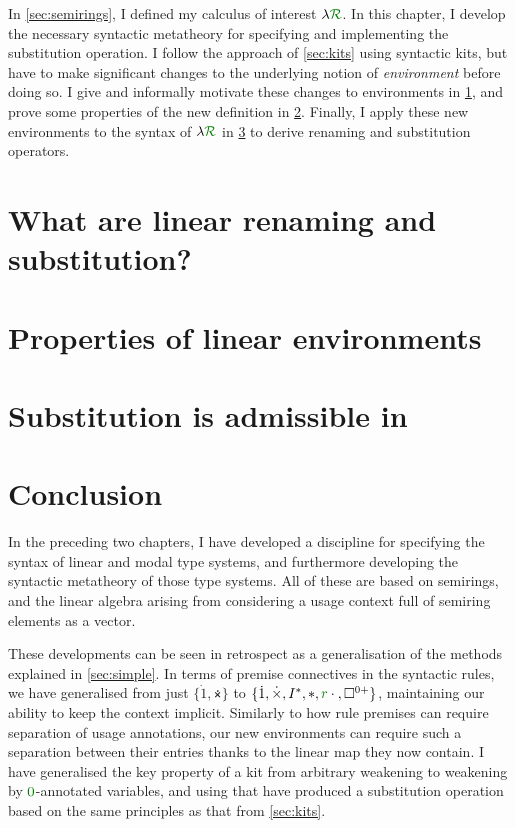 In \cref{sec:semirings}, I defined my calculus of interest $\name$.
In this chapter, I develop the necessary syntactic metatheory for
specifying and implementing the substitution operation.
I follow the approach of \cref{sec:kits} using syntactic kits, but have to make
significant changes to the underlying notion of \emph{environment} before doing
so.
I give and informally motivate these changes to environments in
\cref{sec:lrkits}, and prove some properties of the new definition in
\cref{sec:lenv}.
Finally, I apply these new environments to the syntax of $\name$ in
\cref{sec:lrsub} to derive renaming and substitution operators.

\section{What are linear renaming and substitution?}\label{sec:lrkits}

\section{Properties of linear environments}\label{sec:lenv}

\section{Substitution is admissible in \name{}}\label{sec:lrsub}

\section{Conclusion}\label{sec:ren-sub-lr-conc}

In the preceding two chapters, I have developed a discipline for specifying
the syntax of linear and modal type systems, and furthermore developing the
syntactic metatheory of those type systems.
All of these are based on semirings, and the linear algebra arising from
considering a usage context full of semiring elements as a vector.

These developments can be seen in retrospect as a generalisation of the methods
explained in \cref{sec:simple}.
In terms of premise connectives in the syntactic rules, we have generalised from
just $\{\dot1, \dottimes\}$ to
$\{\dot1, \dottimes, I^*, \sep, \gr r\cdot{}, \Box^{0{+}}\}$, maintaining our
ability to keep the context implicit.
Similarly to how rule premises can require separation of usage annotations, our
new environments can require such a separation between their entries thanks to
the linear map they now contain.
I have generalised the key property of a kit from arbitrary weakening to
weakening by $\gr0$-annotated variables, and using that have produced a
substitution operation based on the same principles as that from
\cref{sec:kits}.


